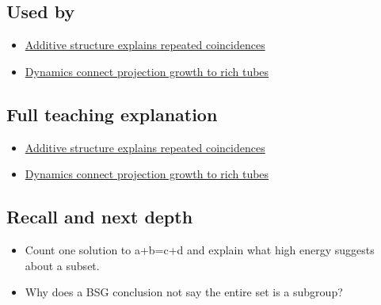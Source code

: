 \subsection{Used by}\label{used-by}

\begin{itemize}
\tightlist
\item
  \href{Continuous\%20Notes/University\%20-\%20Worlds,\%20Images\%20and\%20Inference\%20-\%20Graphics,\%20Vision\%20and\%20Photography\#Additive\%20structure\%20explains\%20repeated\%20coincidences}{Additive structure explains repeated coincidences}
\item
  \href{Continuous\%20Notes/University\%20-\%20Worlds,\%20Images\%20and\%20Inference\%20-\%20Graphics,\%20Vision\%20and\%20Photography\#Dynamics\%20connect\%20projection\%20growth\%20to\%20rich\%20tubes}{Dynamics connect projection growth to rich tubes}
\end{itemize}

\subsection{Full teaching explanation}\label{full-teaching-explanation}

\begin{itemize}
\tightlist
\item
  \href{Continuous\%20Notes/University\%20-\%20Worlds,\%20Images\%20and\%20Inference\%20-\%20Graphics,\%20Vision\%20and\%20Photography\#Additive\%20structure\%20explains\%20repeated\%20coincidences}{Additive structure explains repeated coincidences}
\item
  \href{Continuous\%20Notes/University\%20-\%20Worlds,\%20Images\%20and\%20Inference\%20-\%20Graphics,\%20Vision\%20and\%20Photography\#Dynamics\%20connect\%20projection\%20growth\%20to\%20rich\%20tubes}{Dynamics connect projection growth to rich tubes}
\end{itemize}

\subsection{Recall and next depth}\label{recall-and-next-depth}

\begin{itemize}
\tightlist
\item
  Count one solution to a+b=c+d and explain what high energy suggests about a subset.
\item
  Why does a BSG conclusion not say the entire set is a subgroup?
\end{itemize}

